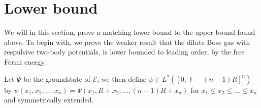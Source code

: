 \documentclass[a4paper,11pt]{article}
\newcommand{\abs}[1]{\left\lvert #1 \right\rvert}
\newcommand{\dom}[1]{\mathscr D\left(#1\right)}
\newcommand*\diff{\mathop{}\!\mathrm{d}}
\newtheorem{lemma}{Lemma}
\numberwithin{equation}{section}
\begin{document}
	\section{Lower bound}
	We will in this section, prove a matching lower bound to the upper bound found above. To begin with, we prove the weaker result that the dilute Bose gas with respulsive two-body potentials, is lower bounded to leading order, by the free Fermi energy.
	
	Let $ \Psi $ be the groundstate of $ \mathcal{E} $, we then define $ \psi\in L^2([0,\ell-(n-1)R]^n) $ by $ \psi(x_1,x_2,...,x_n)=\Psi(x_1,R+x_2,...,(n-1)R+x_n) $ for $ x_1\leq x_2\leq...\leq x_n $ and symmetrically extended.
\end{document}
